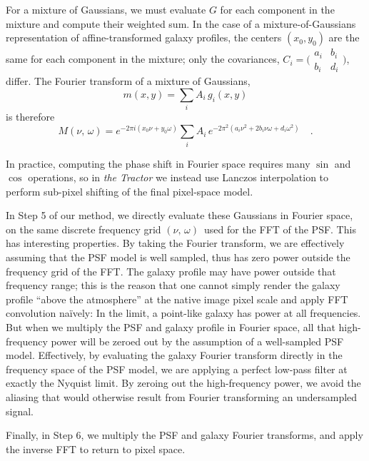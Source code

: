 \documentclass[11pt,preprint]{aastex}
\newcommand{\project}[1]{\textsl{#1}}
\newcommand{\trick}{method}
\newcommand{\pixelfx}{\nu}
\newcommand{\pixelfy}{\omega}
\newcommand{\pixelfreqs}{$(\nu,\, \omega)$}
\begin{document}
For a mixture of Gaussians, we must evaluate $G$ for each component in
the mixture and compute their weighted sum.  In the case of a
mixture-of-Gaussians representation of affine-transformed galaxy
profiles, the centers $(x_0, y_0)$ are the same for each component in
the mixture; only the covariances,
$C_i = \bigl(\begin{smallmatrix}
a_i&b_i \\ b_i&d_i
\end{smallmatrix} \bigr)$,
differ.  The Fourier transform
of a mixture of Gaussians,
\begin{equation}
m(x,y) = \sum_i A_i \, g_i(x, y)
\end{equation}
is therefore
\begin{equation}
M(\pixelfx,\, \pixelfy) = e^{-2 \pi i (x_0 \pixelfx + y_0 \pixelfy)}
\sum_i A_i \,
e^{-2 \pi^2 (a_i \pixelfx^2 + 2 b_i \pixelfx \pixelfy + d_i \pixelfy^2)}
\quad .
\end{equation}

In practice, computing the phase shift in Fourier space requires many
$\sin$ and $\cos$ operations, so in \project{the Tractor} we instead
use Lanczos interpolation to perform sub-pixel shifting of the final
pixel-space model.

In Step 5 of our \trick, we directly evaluate these Gaussians in Fourier
space, on the same discrete frequency grid \pixelfreqs\ used for the FFT
of the PSF.  This has interesting properties.  By taking the Fourier
transform, we are effectively assuming that the PSF model is well
sampled, thus has zero power outside the frequency grid of the FFT.
The galaxy profile may have power outside that frequency range; this
is the reason that one cannot simply render the galaxy profile ``above
the atmosphere'' at the native image pixel scale and apply FFT
convolution na\"ively: In the limit, a point-like galaxy has power at
all frequencies.  But when we multiply the PSF and galaxy profile in
Fourier space, all that high-frequency power will be zeroed out by the
assumption of a well-sampled PSF model.  Effectively, by evaluating the
galaxy Fourier transform directly in the frequency space of the PSF
model, we are applying a perfect low-pass filter at exactly the
Nyquist limit.  By zeroing out the high-frequency power, we avoid the
aliasing that would otherwise result from Fourier transforming an
undersampled signal.

Finally, in Step 6, we multiply the PSF and galaxy Fourier transforms,
and apply the inverse FFT to return to pixel space.
\end{document}
